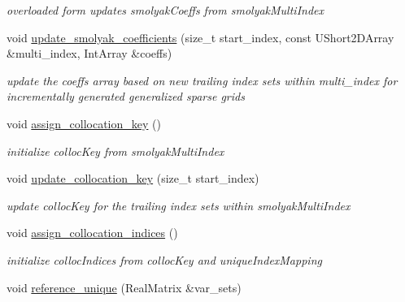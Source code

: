 \begin{DoxyCompactItemize}
\begin{DoxyCompactList}\small\item\em overloaded form updates smolyak\+Coeffs from smolyak\+Multi\+Index \end{DoxyCompactList}\item 
void \hyperlink{classPecos_1_1CombinedSparseGridDriver_abad795e198f5aca178a132094cf7b99c}{update\+\_\+smolyak\+\_\+coefficients} (size\+\_\+t start\+\_\+index, const U\+Short2\+D\+Array \&multi\+\_\+index, Int\+Array \&coeffs)\label{classPecos_1_1CombinedSparseGridDriver_abad795e198f5aca178a132094cf7b99c}

\begin{DoxyCompactList}\small\item\em update the coeffs array based on new trailing index sets within multi\+\_\+index for incrementally generated generalized sparse grids \end{DoxyCompactList}\item 
void \hyperlink{classPecos_1_1CombinedSparseGridDriver_a9d17415950cab71229a9e2968121ff22}{assign\+\_\+collocation\+\_\+key} ()\label{classPecos_1_1CombinedSparseGridDriver_a9d17415950cab71229a9e2968121ff22}

\begin{DoxyCompactList}\small\item\em initialize colloc\+Key from smolyak\+Multi\+Index \end{DoxyCompactList}\item 
void \hyperlink{classPecos_1_1CombinedSparseGridDriver_a73d4f5d5a559d093a42939a3c79b17b5}{update\+\_\+collocation\+\_\+key} (size\+\_\+t start\+\_\+index)\label{classPecos_1_1CombinedSparseGridDriver_a73d4f5d5a559d093a42939a3c79b17b5}

\begin{DoxyCompactList}\small\item\em update colloc\+Key for the trailing index sets within smolyak\+Multi\+Index \end{DoxyCompactList}\item 
void \hyperlink{classPecos_1_1CombinedSparseGridDriver_ad9e72cee34135fb982921365ccd615cd}{assign\+\_\+collocation\+\_\+indices} ()\label{classPecos_1_1CombinedSparseGridDriver_ad9e72cee34135fb982921365ccd615cd}

\begin{DoxyCompactList}\small\item\em initialize colloc\+Indices from colloc\+Key and unique\+Index\+Mapping \end{DoxyCompactList}\item 
void \hyperlink{classPecos_1_1CombinedSparseGridDriver_a87e86b0c9c443b48aa7bba85ace25c4a}{reference\+\_\+unique} (Real\+Matrix \&var\+\_\+sets)\label{classPecos_1_1CombinedSparseGridDriver_a87e86b0c9c443b48aa7bba85ace25c4a}


\end{DoxyCompactItemize}
